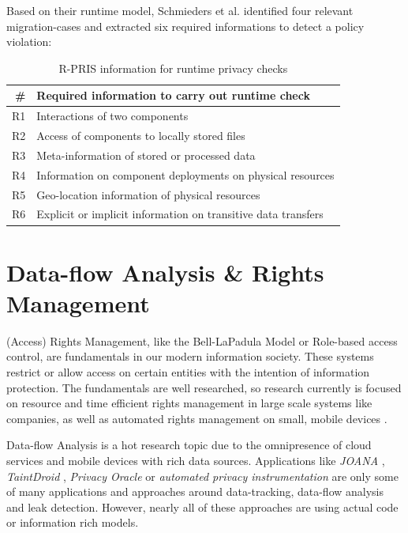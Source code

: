 Based on their runtime model, Schmieders et al. identified four relevant migration-cases and extracted six required informations to detect a policy violation\cite{Schmieders.2015}:

\begin{table}[h]
	\centering
	\begin{tabular}{r | l}
		\hline
		\textbf{\#} & \textbf{Required information to carry out runtime check}\\
		\hline
		R1 & Interactions of two components\\
		R2 & Access of components to locally stored files\\
		R3 & Meta-information of stored or processed data\\
		R4 & Information on component deployments on physical resources \\
		R5 & Geo-location information of physical resources\\
		R6 & Explicit or implicit information on transitive data transfers\\
		\hline
	\end{tabular}
	\caption{R-PRIS information for runtime privacy checks \cite{Schmieders.2015}}
	\label{tab:rpris_information}
\end{table}


\section{Data-flow Analysis \& Rights Management}
\label{sec:RelatedWork:dataflow}

(Access) Rights Management, like the Bell-LaPadula Model or Role-based access control, are fundamentals in our modern information society. These systems restrict or allow access on certain entities with the intention of information protection. The fundamentals are well researched, so research currently is focused on resource and time efficient rights management in large scale systems like companies, as well as automated rights management on small, mobile devices \cite{Dinger.2008}.

Data-flow Analysis is a hot research topic due to the omnipresence of cloud services and mobile devices with rich data sources. Applications like \textit{JOANA} \cite{Snelting.2014}, \textit{TaintDroid} \cite{Enck.2014}, \textit{Privacy Oracle}  \cite{Jung.2008} or \textit{automated privacy instrumentation} \cite{Suh.2004} are only some of many applications and approaches around data-tracking, data-flow analysis and leak detection. However, nearly all of these approaches are using actual code or information rich models.

